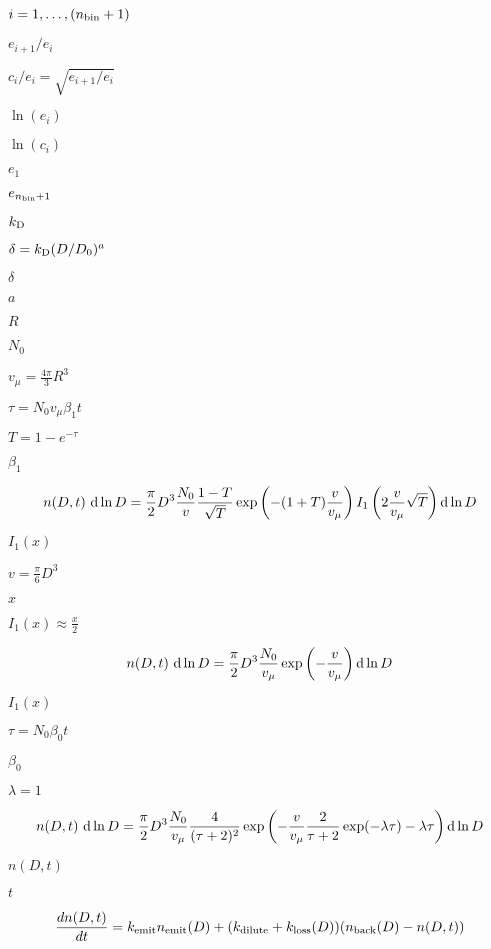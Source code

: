 \documentclass{article}
\begin{document}
$i =
 1,\ldots,(n_{\rm bin} + 1)$
\pagebreak

$e_{i+1}/e_i$
\pagebreak

$c_i/e_i = \sqrt{e_{i+1}/e_i}$
\pagebreak

$\ln(e_i)$
\pagebreak

$\ln(c_i)$
\pagebreak

$e_1$
\pagebreak

$e_{n_{\rm bin} + 1}$
\pagebreak

$k_{\rm D}$
\pagebreak

$ \delta = k_{\rm D}(D/D_0)^a $
\pagebreak

$ \delta $
\pagebreak

$a$
\pagebreak

$R$
\pagebreak

$N_0$
\pagebreak

$v_\mu = \frac{4\pi}{3} R^3$
\pagebreak

$\tau = N_0 v_\mu \beta_1 t$
\pagebreak

$T = 1 -
 e^{-\tau}$
\pagebreak

$\beta_1$
\pagebreak

\[
     n(D,t) \ {\rm d}\ln D
     = \frac{\pi}{2} D^3
       \frac{N_0}{v} \frac{1 - T}{\sqrt{T}}
       \exp\left(-(1 + T) \frac{v}{v_\mu}\right)
       I_1\left(2 \frac{v}{v_\mu} \sqrt{T}\right) {\rm d}\ln D
 \]
\pagebreak

$I_1(x)$
\pagebreak

$v = \frac{\pi}{6}
 D^3$
\pagebreak

$x$
\pagebreak

$I_1(x) \approx \frac{x}{2}$
\pagebreak

\[
     n(D,t) \ {\rm d}\ln D
     = \frac{\pi}{2} D^3 \frac{N_0}{v_\mu}
     \exp\left(-\frac{v}{v_\mu}\right) {\rm d}\ln D
 \]
\pagebreak

$ I_1(x) $
\pagebreak

$\tau = N_0 \beta_0 t$
\pagebreak

$\beta_0$
\pagebreak

$\lambda = 1$
\pagebreak

\[
     n(D,t) \ {\rm d}\ln D
     = \frac{\pi}{2} D^3 \frac{N_0}{v_\mu} \frac{4}{(\tau + 2)^2}
     \exp\left(-\frac{v}{v_\mu} \frac{2}{\tau + 2}
     \exp(-\lambda \tau) - \lambda \tau\right) {\rm d}\ln D
 \]
\pagebreak

$n(D,t)$
\pagebreak

$t$
\pagebreak

\[
     \frac{d n(D,t)}{dt} = k_{\rm emit} n_{\rm emit}(D)
         + (k_{\rm dilute} + k_{\rm loss}(D)) (n_{\rm back}(D) - n(D,t))
 \]
\pagebreak
\end{document}
